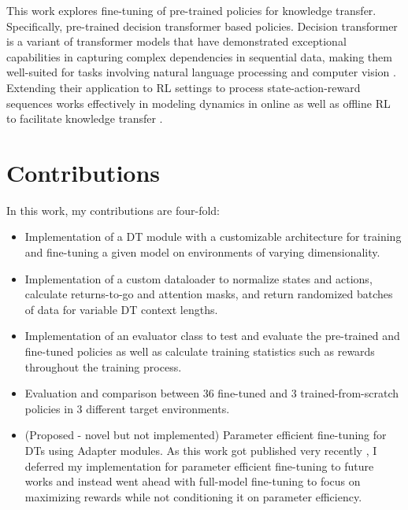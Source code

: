 \documentclass[10pt,a4paper]{article}
\begin{document}
This work explores fine-tuning of pre-trained policies for knowledge 
transfer. Specifically, pre-trained decision transformer based policies. 
Decision transformer \cite{chen2021decision} is a variant of transformer 
models \cite{vaswani2017attention} that have demonstrated exceptional 
capabilities in capturing complex dependencies in sequential data, making 
them well-suited for tasks involving natural language processing 
\cite{vaswani2017attention} and computer vision \cite{dosovitskiy2020image}. 
Extending their application to RL settings to process state-action-reward 
sequences works effectively in modeling dynamics in online \cite{zheng2022online} 
as well as offline \cite{meng2021offline, furuta2021generalized} RL to 
facilitate knowledge transfer \cite{lee2022multi, xu2023hyper}.

\section{Contributions}
In this work, my contributions are four-fold:
\begin{itemize}
    \item Implementation of a DT module with a customizable architecture for training and fine-tuning a given model on environments of varying dimensionality.
    \item Implementation of a custom dataloader to normalize states and actions, calculate returns-to-go and attention masks, and return randomized batches of data for variable DT context lengths.
    \item Implementation of an evaluator class to test and evaluate the pre-trained and fine-tuned policies as well as calculate training statistics such as rewards throughout the training process.
    \item Evaluation and comparison between 36 fine-tuned and 3 trained-from-scratch policies in 3 different target environments.
    \item (Proposed - novel but not implemented) Parameter efficient fine-tuning for DTs using Adapter\cite{houlsby2019parameter} modules. 
            As this work got published very recently \cite{xu2023hyper}, 
            I deferred my implementation for parameter efficient fine-tuning to future works 
            and instead went ahead with full-model fine-tuning to focus on maximizing rewards 
            while not conditioning it on parameter efficiency.
\end{itemize}
\end{document}
